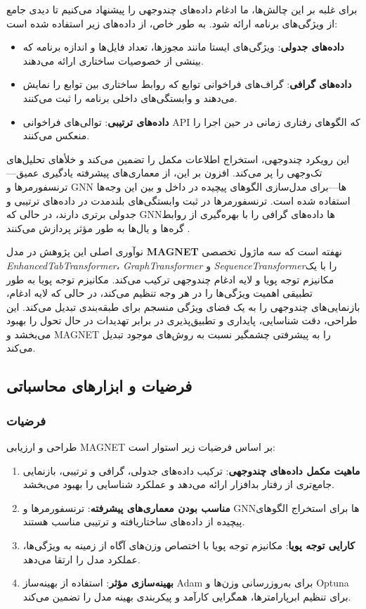 برای غلبه بر این چالش‌ها، ما ادغام داده‌های چندوجهی را پیشنهاد می‌کنیم تا دیدی جامع از ویژگی‌های برنامه ارائه شود. به طور خاص، از داده‌های زیر استفاده شده است:
\begin{itemize}
    \item \textbf{داده‌های جدولی}: ویژگی‌های ایستا مانند مجوزها، تعداد فایل‌ها و اندازه برنامه که بینشی از خصوصیات ساختاری ارائه می‌دهند.
    \item \textbf{داده‌های گرافی}: گراف‌های فراخوانی توابع که روابط ساختاری بین توابع را نمایش می‌دهند و وابستگی‌های داخلی برنامه را ثبت می‌کنند.
    \item \textbf{داده‌های ترتیبی}: توالی‌های فراخوانی API که الگوهای رفتاری زمانی در حین اجرا را منعکس می‌کنند.
\end{itemize}
این رویکرد چندوجهی، استخراج اطلاعات مکمل را تضمین می‌کند و خلأهای تحلیل‌های تک‌وجهی را پر می‌کند. افزون بر این، از معماری‌های پیشرفته یادگیری عمیق—ترنسفورمرها و GNN ها—برای مدل‌سازی الگوهای پیچیده در داخل و بین این وجه‌ها استفاده شده است. ترنسفورمرها در ثبت وابستگی‌های بلندمدت در داده‌های ترتیبی و جدولی برتری دارند، در حالی که GNNها داده‌های گرافی را با بهره‌گیری از روابط گره‌ها و یال‌ها به طور مؤثر پردازش می‌کنند \cite{attention, Kipf2017}.

نوآوری اصلی این پژوهش در مدل \textbf{MAGNET} نهفته است که سه ماژول تخصصی \textit{EnhancedTabTransformer}، \textit{GraphTransformer} و \textit{SequenceTransformer}را با یک مکانیزم توجه پویا و لایه ادغام چندوجهی ترکیب می‌کند. مکانیزم توجه پویا به طور تطبیقی اهمیت ویژگی‌ها را در هر وجه تنظیم می‌کند، در حالی که لایه ادغام، بازنمایی‌های چندوجهی را به یک فضای ویژگی منسجم برای طبقه‌بندی تبدیل می‌کند. این طراحی، دقت شناسایی، پایداری و تطبیق‌پذیری در برابر تهدیدات در حال تحول را بهبود می‌بخشد و MAGNET را به پیشرفتی چشمگیر نسبت به روش‌های موجود تبدیل می‌کند.

\subsection{فرضیات و ابزارهای محاسباتی}

\subsubsection{فرضیات}
طراحی و ارزیابی MAGNET بر اساس فرضیات زیر استوار است:
\begin{enumerate}
    \item \textbf{ماهیت مکمل داده‌های چندوجهی}: ترکیب داده‌های جدولی، گرافی و ترتیبی، بازنمایی جامع‌تری از رفتار بدافزار ارائه می‌دهد و عملکرد شناسایی را بهبود می‌بخشد.
    \item \textbf{مناسب بودن معماری‌های پیشرفته}: ترنسفورمرها و GNNها برای استخراج الگوهای پیچیده از داده‌های ساختاریافته و ترتیبی مناسب هستند.
    \item \textbf{کارایی توجه پویا}: مکانیزم توجه پویا با اختصاص وزن‌های آگاه از زمینه به ویژگی‌ها، عملکرد مدل را ارتقا می‌دهد.
    \item \textbf{بهینه‌سازی مؤثر}: استفاده از بهینه‌ساز Adam برای به‌روزرسانی وزن‌ها و Optuna برای تنظیم ابرپارامترها، همگرایی کارآمد و پیکربندی بهینه مدل را تضمین می‌کند.
\end{enumerate}

